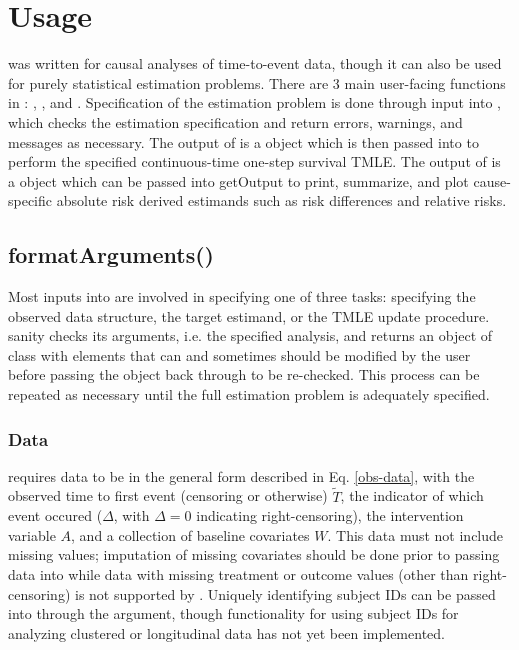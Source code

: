 \documentclass{report}
\newcommand{\1}{\ensuremath{\mathbf{1}}}
\newcommand{\T}{\ensuremath{\widetilde{T}}}
\renewcommand{\L}{\ensuremath{W}}
\begin{document}
\section{Usage}
\label{UsingConcrete}
 was written for causal analyses of time-to-event data, though it can also be used for purely statistical estimation problems. There are 3 main user-facing functions in : , , and . Specification of the estimation problem is done through input into , which checks the estimation specification and return errors, warnings, and messages as necessary. The output of  is a  object which is then passed into  to perform the specified continuous-time one-step survival TMLE. The output of  is a  object which can be passed into getOutput to print, summarize, and plot cause-specific absolute risk derived estimands such as risk differences and relative risks. 

\subsection{formatArguments()}
\label{formatArguments}
Most inputs into  are involved in specifying one of three tasks: specifying the observed data structure, the target estimand, or the TMLE update procedure.  sanity checks its arguments, i.e. the specified analysis, and returns an object of class  with elements that can and sometimes should be modified by the user before passing the  object back through  to be re-checked. This process can be repeated as necessary until the full estimation problem is adequately specified.

\subsubsection{Data}
\label{ObservedDataConcrete}
 requires data to be in the general form described in Eq. \eqref{obs-data}, with the observed time to first event (censoring or otherwise) \(\T\), the indicator of which event occured (\(\Delta\), with \(\Delta = 0\) indicating right-censoring), the intervention variable \(A\), and a collection of baseline covariates \(\L\). This data must not include missing values; imputation of missing covariates should be done prior to passing data into  while data with missing treatment or outcome values (other than right-censoring) is not supported by . Uniquely identifying subject IDs can be passed into  through the  argument, though functionality for using subject IDs for analyzing clustered or longitudinal data has not yet been implemented.
\end{document}
